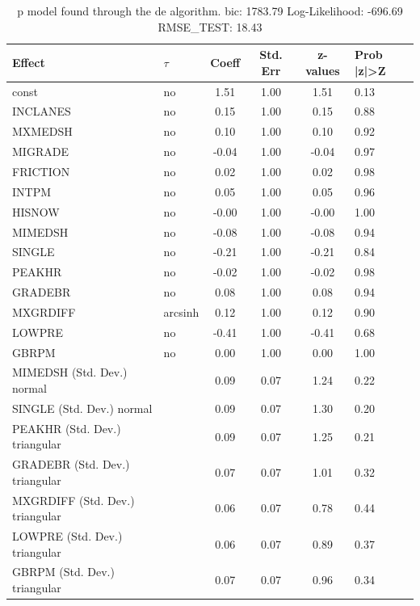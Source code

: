 \begin{table}
	\caption{p model found through the de algorithm. bic: 1783.79 Log-Likelihood: -696.69 RMSE_TEST: 18.43}
	\begin{center}
		\begin{tabular}{|l|l|c|c|c|l|}
			\hline
			Effect & $\tau$ & Coeff & Std. Err & z-values & Prob |z|>Z \\
			\hline
			const & no & 1.51 & 1.00 & 1.51 & 0.13 \\
			\hline
			INCLANES & no & 0.15 & 1.00 & 0.15 & 0.88 \\
			\hline
			MXMEDSH & no & 0.10 & 1.00 & 0.10 & 0.92 \\
			\hline
			MIGRADE & no & -0.04 & 1.00 & -0.04 & 0.97 \\
			\hline
			FRICTION & no & 0.02 & 1.00 & 0.02 & 0.98 \\
			\hline
			INTPM & no & 0.05 & 1.00 & 0.05 & 0.96 \\
			\hline
			HISNOW & no & -0.00 & 1.00 & -0.00 & 1.00 \\
			\hline
			MIMEDSH & no & -0.08 & 1.00 & -0.08 & 0.94 \\
			\hline
			SINGLE & no & -0.21 & 1.00 & -0.21 & 0.84 \\
			\hline
			PEAKHR & no & -0.02 & 1.00 & -0.02 & 0.98 \\
			\hline
			GRADEBR & no & 0.08 & 1.00 & 0.08 & 0.94 \\
			\hline
			MXGRDIFF & arcsinh & 0.12 & 1.00 & 0.12 & 0.90 \\
			\hline
			LOWPRE & no & -0.41 & 1.00 & -0.41 & 0.68 \\
			\hline
			GBRPM & no & 0.00 & 1.00 & 0.00 & 1.00 \\
			\hline
			MIMEDSH (Std. Dev.) normal &  & 0.09 & 0.07 & 1.24 & 0.22 \\
			\hline
			SINGLE (Std. Dev.) normal &  & 0.09 & 0.07 & 1.30 & 0.20 \\
			\hline
			PEAKHR (Std. Dev.) triangular &  & 0.09 & 0.07 & 1.25 & 0.21 \\
			\hline
			GRADEBR (Std. Dev.) triangular &  & 0.07 & 0.07 & 1.01 & 0.32 \\
			\hline
			MXGRDIFF (Std. Dev.) triangular &  & 0.06 & 0.07 & 0.78 & 0.44 \\
			\hline
			LOWPRE (Std. Dev.) triangular &  & 0.06 & 0.07 & 0.89 & 0.37 \\
			\hline
			GBRPM (Std. Dev.) triangular &  & 0.07 & 0.07 & 0.96 & 0.34 \\
			\hline
		\end{tabular}
	\end{center}
\end{table}
